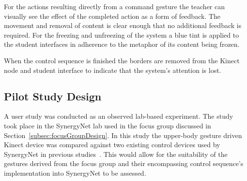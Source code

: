\documentclass[link]{IWCOMP}
\begin{document}
For the actions resulting directly from a command gesture the teacher can visually see the effect of the completed action as a form of feedback.
The movement and removal of content is clear enough that no additional feedback is required.
For the freezing and unfreezing of the system a blue tint is applied to the student interfaces in adherence to the metaphor of its content being frozen.

When the control sequence is finished the borders are removed from the Kinect node and student interface to indicate that the system's attention is lost.

\subsection{Pilot Study Design}
\label{subsec:pilotStudyDesign}


A user study was conducted as an observed lab-based experiment.
The study took place in the SynergyNet lab used in the focus group discussed in Section~\ref{subsec:focusGroupDesign}.
In this study the upper-body gesture driven Kinect device was compared against two existing control devices used by SynergyNet in previous studies~\cite{Mercier2012}.
This would allow for the suitability of the gestures derived from the focus group and their encompassing control sequence's implementation into SynergyNet to be assessed.
\end{document}
